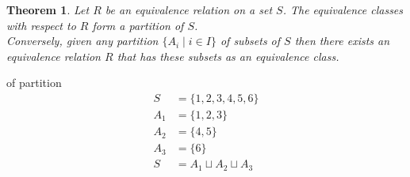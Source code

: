 \documentclass[letterpaper, 12pt]{article}
\newtheorem{theorem}{Theorem}[section]
\newenvironment{example}[1][Example]{\begin{trivlist}
\item[\hskip \labelsep {\bfseries #1}]}{\end{trivlist}}
\newcommand{\0}{\emptyset}
\begin{document}
    \begin{theorem}
        Let $R$ be an equivalence relation on a set $S$. The equivalence classes with respect to 
        $R$ form a partition of $S$. \\
        Conversely, given any partition $\{A_i \mid i \in I\}$ of subsets of $S$ then there exists 
        an equivalence relation $R$ that has these subsets as an equivalence class.
    \end{theorem}
    \begin{example}
        of partition
        \begin{align*}
            S &= \{1,2,3,4,5,6\} \\
            A_1 &= \{1,2,3\} \\
            A_2 &= \{4,5\} \\
            A_3 &= \{6\} \\
            S &= A_1 \sqcup A_2 \sqcup A_3
        \end{align*}
    \end{example}
\end{document}
